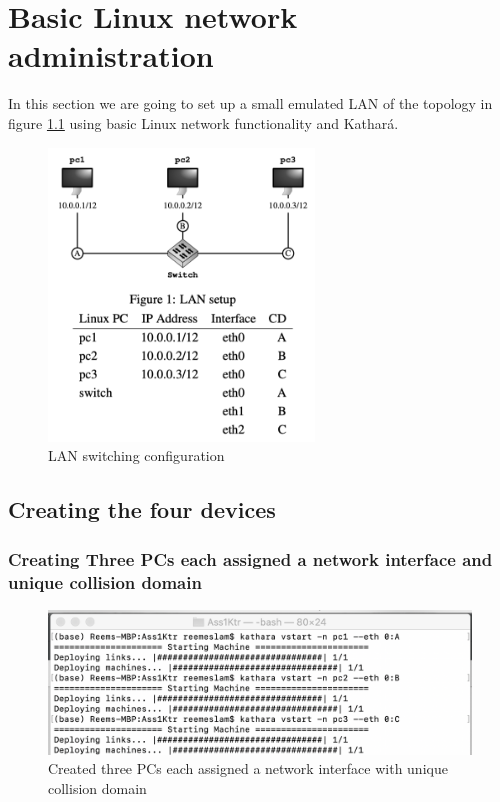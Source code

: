 \label{Basic Linux network}
\chapter{Basic Linux network administration}
In this section we are going to set up a small emulated LAN of the topology in figure \ref{fig:3.1} using basic Linux network functionality and Kathará.
\begin{figure}[H]
\centering
  \includegraphics[width=200pt]{Images/networkFig.png}
  \caption{LAN switching configuration}
  \label{fig:3.1}
\end{figure}

\section{Creating the four devices}
\subsection{Creating Three PCs each assigned a network interface and unique collision domain}
\begin{figure}[H]
\centering
  \includegraphics[width=500pt]{Images/task5.1.png}
  \caption{Created three PCs each assigned a network interface with unique collision domain}
  \label{fig:3.2}
\end{figure}

